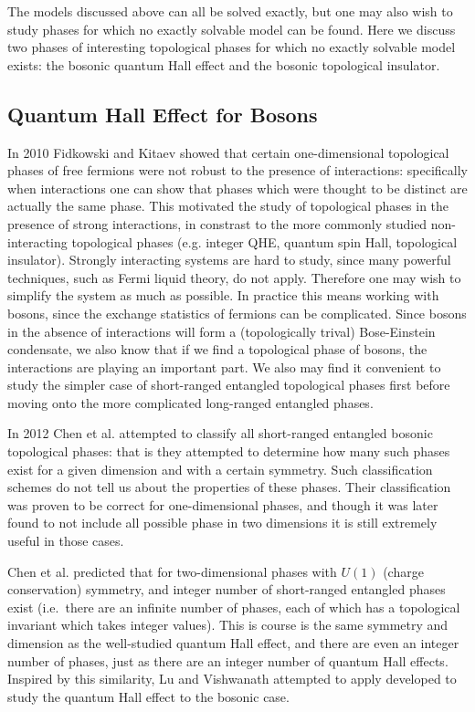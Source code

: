 The models discussed above can all be solved exactly, but one may also wish to study phases for which no exactly solvable model can be found. Here we discuss two phases of interesting topological phases for which no exactly solvable model exists: the bosonic quantum Hall effect and the bosonic topological insulator.

\subsection{Quantum Hall Effect for Bosons}
\label{subsec::FQHEintro}

In 2010 Fidkowski and Kitaev\cite{FidkowskiKitaev2011} showed that certain one-dimensional topological phases of free fermions were not robust to the presence of interactions: specifically when interactions one can show that phases which were thought to be distinct are actually the same phase. This motivated the study of topological phases in the presence of strong interactions, in constrast to the more commonly studied non-interacting topological phases (e.g. integer QHE, quantum spin Hall, topological insulator). Strongly interacting systems are hard to study, since many powerful techniques, such as Fermi liquid theory, do not apply. Therefore one may wish to simplify the system as much as possible. In practice this means working with bosons, since the exchange statistics of fermions can be complicated. Since bosons in the absence of interactions will form a (topologically trival) Bose-Einstein condensate, we also know that if we find a topological phase of bosons, the interactions are playing an important part. We also may find it convenient to study the simpler case of short-ranged entangled topological phases first before moving onto the more complicated long-ranged entangled phases.

In 2012 Chen et al.\cite{WenScience,WenPRB} attempted to classify all short-ranged entangled bosonic topological phases: that is they attempted to determine how many such phases exist for a given dimension and with a certain symmetry. Such classification schemes do not tell us about the properties of these phases. Their classification was proven to be correct for one-dimensional phases, and though it was later found to not include all possible phase in two dimensions\cite{LuVishwanath,KapustinThorngren} it is still extremely useful in those cases.

Chen et al. predicted that for two-dimensional phases with $U(1)$ (charge conservation) symmetry, and integer number of short-ranged entangled phases exist (i.e.~there are an infinite number of phases, each of which has a topological invariant which takes integer values). This is course is the same symmetry and dimension as the well-studied quantum Hall effect, and there are even an integer number of phases, just as there are an integer number of quantum Hall effects. Inspired by this similarity, Lu and Vishwanath \cite{LuVishwanath} attempted to apply developed to study the quantum Hall effect to the bosonic case.

